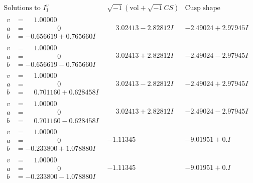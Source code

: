 \documentclass[1p]{elsarticle_modified}
\theoremstyle{definition}
\newcommand{\I}{\sqrt{-1}}
\begin{document}
$$\begin{array}{c|c|c}  
\text{Solutions to }I^v_{1}& \I (\text{vol} + \sqrt{-1}CS) & \text{Cusp shape}\\
 \hline 
\begin{aligned}
v &= \phantom{-}1.00000\phantom{ +0.000000I} \\
a &= \phantom{-0.000000 } 0 \\
b &= -0.656619 + 0.765660 I\end{aligned}
 & \phantom{-}3.02413 - 2.82812 I & -2.49024 + 2.97945 I \\ \hline\begin{aligned}
v &= \phantom{-}1.00000\phantom{ +0.000000I} \\
a &= \phantom{-0.000000 } 0 \\
b &= -0.656619 - 0.765660 I\end{aligned}
 & \phantom{-}3.02413 + 2.82812 I & -2.49024 - 2.97945 I \\ \hline\begin{aligned}
v &= \phantom{-}1.00000\phantom{ +0.000000I} \\
a &= \phantom{-0.000000 } 0 \\
b &= \phantom{-}0.701160 + 0.628458 I\end{aligned}
 & \phantom{-}3.02413 - 2.82812 I & -2.49024 + 2.97945 I \\ \hline\begin{aligned}
v &= \phantom{-}1.00000\phantom{ +0.000000I} \\
a &= \phantom{-0.000000 } 0 \\
b &= \phantom{-}0.701160 - 0.628458 I\end{aligned}
 & \phantom{-}3.02413 + 2.82812 I & -2.49024 - 2.97945 I \\ \hline\begin{aligned}
v &= \phantom{-}1.00000\phantom{ +0.000000I} \\
a &= \phantom{-0.000000 } 0 \\
b &= -0.233800 + 1.078880 I\end{aligned}
 & -1.11345\phantom{ +0.000000I} & -9.01951 + 0. I\phantom{ +0.000000I} \\ \hline\begin{aligned}
v &= \phantom{-}1.00000\phantom{ +0.000000I} \\
a &= \phantom{-0.000000 } 0 \\
b &= -0.233800 - 1.078880 I\end{aligned}
 & -1.11345\phantom{ +0.000000I} & -9.01951 + 0. I\phantom{ +0.000000I} \\ \hline\begin{aligned}

\end{aligned}
\end{array}$$
\end{document}
